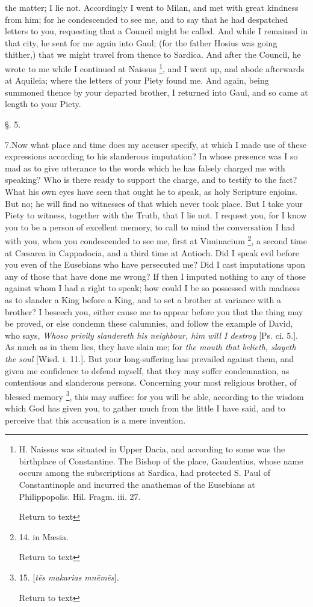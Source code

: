 the matter; I lie not. Accordingly I went to Milan, and met with great
kindness from him; for he condescended to see me, and to say that he
had despatched letters to you, requesting that a Council might be
called. And while I remained in that city, he sent for me again into
Gaul; (for the father Hosius was going thither,) that we might travel
from thence to Sardica. And after the Council, he wrote to me while I
continued at Naissus \footnote{H. Naissus was situated in Upper Dacia, and according to some was the
birthplace of Constantine. The Bishop of the place, Gaudentius, whose
name occurs among the subscriptions at Sardica, had protected S. Paul
of Constantinople and incurred the anathemas of the Eusebians at
Philippopolis. Hil. Fragm. iii. 27.

Return to text}, and
I went up, and abode afterwards at Aquileia; where the letters
of your Piety found me. And again, being summoned thence by your
departed brother, I returned into Gaul, and so came at length to your
Piety.

§. 5.

7.Now what place and time does my accuser specify, at which I made use
of these expressions according to his slanderous imputation? In whose
presence was I so mad as to give utterance to the words which he has
falsely charged me with speaking? Who is there ready to support the
charge, and to testify to the fact? What his own eyes have seen that
ought he to speak, as holy Scripture enjoins. But no; he will find no
witnesses of that which never took place. But I take your Piety to
witness, together with the Truth, that I lie not. I request you, for I
know you to be a person of excellent memory, to call to mind the
conversation I had with you, when you condescended to see me, first at
Viminacium \footnote{14. in Mæsia.

Return to text}, a second
time at Cæsarea in Cappadocia, and a third time at Antioch. Did I
speak evil before you even of the Eusebians who have persecuted me?
Did I cast imputations upon any of those that have done me wrong? If
then I imputed nothing to any of those against whom I had a right to
speak; how could I be so possessed with madness as to slander a King
before a King, and to set a brother at variance with a brother? I
beseech you, either cause me to appear before you that the thing may
be proved, or else condemn these calumnies, and follow the example of
David, who says, \emph{Whoso
privily slandereth his neighbour, him will I destroy}
[Ps. ci. 5.]. As much as in them lies, they have slain me; for \emph{the mouth that belieth, slayeth
the soul} [Wisd. i. 11.]. But your long-suffering has prevailed against them, and
given me confidence to defend myself, that they may suffer
condemnation, as contentious and slanderous persons. Concerning your
most religious brother, of blessed memory \footnote{15. [\emph{t\={e}s
makarias mn\={e}m\={e}s}].

Return to text}, this may suffice: for you will be able, according to the
wisdom which God has given you, to gather much from the little I have
said, and to perceive that this accusation is a mere invention.

